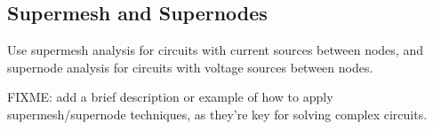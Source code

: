 \documentclass[letterpaper]{scrartcl}
\begin{document}
\subsection*{Supermesh and Supernodes}
Use supermesh analysis for circuits with current sources between nodes, and supernode analysis for circuits with voltage sources between nodes.

FIXME: add a brief description or example of how to apply supermesh/supernode techniques, as they’re key for solving complex circuits.
\end{document}
